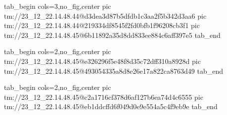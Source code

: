  
 
 
 
 

\qqSecCmtScr


\ifcmt
  tab_begin cols=3,no_fig,center
    pic tm://23_12_22.14.48.44@d3dea3d87b5dfdb1c3aa2f5b342d3aa6
    pic tm://23_12_22.14.48.44@219334df8545f2fd0bfb1f96208cb3f1
    pic tm://23_12_22.14.48.45@6b11892a35d8dd833ee884c6aff397e5
  tab_end
\fi


\ifcmt
  tab_begin cols=2,no_fig,center
    pic tm://23_12_22.14.48.45@e326296f5e48f8d35c72dff310a8928d
    pic tm://23_12_22.14.48.45@493054335a8d8e26e17a822ca8763d49
  tab_end
\fi


\ifcmt
  tab_begin cols=2,no_fig,center
    pic tm://23_12_22.14.48.45@c2a1716cf378d6af127b6ea74d4c6555
    pic tm://23_12_22.14.48.45@eb1ddcffd6f049d0e9e554a5c4f9eb9e
  tab_end
\fi


